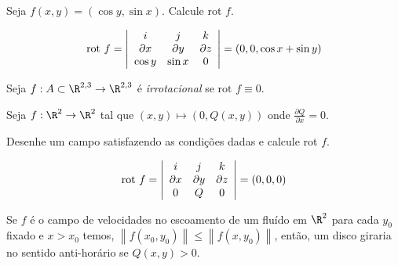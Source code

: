 \documentclass[11pt, oneside, a4paper]{gsm-l}
\begin{document}
\begin{exem}
Seja $f\left( {x,y} \right) = \left( {\cos y,\sin x} \right)$. Calcule rot $f$.
\end{exem}

\begin{sol}
\[
{\text{rot }}f = \left| {\begin{array}{*{20}c}
   i & j & k  \\
   {\partial x} & {\partial y} & {\partial z}  \\
   {\cos y} & {\sin x} & 0  \\

 \end{array} } \right| = \left( {0,0,\cos x + \sin y} \right)
\]

\end{sol}

\begin{defi}
Seja $f:A \subset \R^{2,3}  \to \R^{2,3}$ é \textit{irrotacional} se ${\text{rot }}f \equiv 0$.
\end{defi}

\begin{exem}
Seja $f:\R^2  \to \R^2$ tal que $\left( {x,y} \right) \mapsto \left( {0,Q\left( {x,y} \right)} \right)$ onde $\frac{{\partial Q}}{{\partial x}} = 0$.

Desenhe um campo satisfazendo as condições dadas e calcule rot $f$.
\end{exem}

\begin{sol}

\[
{\text{rot }}f = \left| {\begin{array}{*{20}c}
   i & j & k  \\
   {\partial x} & {\partial y} & {\partial z}  \\
   0 & Q & 0  \\

 \end{array} } \right| = \left( {0,0,0} \right)
\]

\end{sol}

\begin{exem}
Se $f$ é o campo de velocidades no escoamento de um fluído em $\R^2$ para cada $y_0$ fixado e $x > x_0$ temos, $\left\| {f\left( {x_0 ,y_0 } \right)} \right\| \leqslant \left\| {f\left( {x,y_0 } \right)} \right\|$, então, um disco giraria no sentido anti-horário se $Q\left( {x,y} \right) > 0$.
\end{exem}
\end{document}
